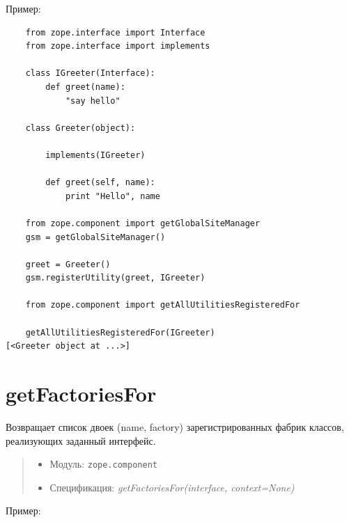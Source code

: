 \documentclass[a4paper,openany,twoside,final]{book}
\providecommand*{\DUroletitlereference}[1]{\textsl{#1}}
\begin{document}
Пример:

\begin{verbatim}
    from zope.interface import Interface
    from zope.interface import implements

    class IGreeter(Interface):
        def greet(name):
            "say hello"

    class Greeter(object):

        implements(IGreeter)

        def greet(self, name):
            print "Hello", name

    from zope.component import getGlobalSiteManager
    gsm = getGlobalSiteManager()

    greet = Greeter()
    gsm.registerUtility(greet, IGreeter)

    from zope.component import getAllUtilitiesRegisteredFor

    getAllUtilitiesRegisteredFor(IGreeter)
[<Greeter object at ...>]
\end{verbatim}


\section*{getFactoriesFor%
  \label{getfactoriesfor}%
}

Возвращает список двоек (name, factory) зарегистрированных фабрик классов, реализующих заданный интерфейс.

\begin{quote}

\begin{itemize}

\item Модуль: \texttt{zope.component}

\item Спецификация: \DUroletitlereference{getFactoriesFor(interface, context=None)}

\end{itemize}

\end{quote}

Пример:
\end{document}
